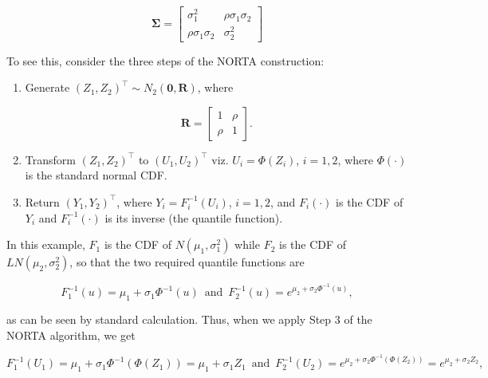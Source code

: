 \documentclass[
]{jss}
\begin{document}
\begin{equation}
\label{eq:kram2}
\boldsymbol \Sigma = 
\begin{bmatrix}
\sigma_1^2 & \rho \sigma_1\sigma_2\\
\rho \sigma_1\sigma_2 & \sigma_2^2
\end{bmatrix}
\end{equation}

To see this, consider the three steps of the NORTA construction:

\begin{enumerate}

\item Generate $(Z_1, Z_2)^\top \sim N_2(\boldsymbol 0, \boldsymbol R)$, where 

\begin{equation}
\label{eq:kram3}
\boldsymbol R = 
\left[
\begin{array}{cc}
1 & \rho \\
\rho & 1
\end{array}
\right].
\end{equation}


\item Transform $(Z_1, Z_2)^\top$ to $(U_1, U_2)^\top$ viz. $U_i =\Phi(Z_i)$,  $i=1,2$, where $\Phi(\cdot)$ is the standard normal CDF. 

\item Return $(Y_1, Y_2)^\top$, where $Y_i=F_i^{-1}(U_i)$, $i=1,2$, and $F_i(\cdot)$ is the CDF of $Y_i$ and $F_i^{-1}(\cdot)$ is its inverse (the quantile function). 

\end{enumerate}

In this example, \(F_1\) is the CDF of \(N(\mu_1, \sigma_1^2)\) while
\(F_2\) is the CDF of \(LN(\mu_2, \sigma_2^2)\), so that the two
required quantile functions are

\begin{equation}
\label{eq:kram4}
F_1^{-1}(u) = \mu_1+\sigma_1 \Phi^{-1}(u)\,\,\, \mbox{and} \,\,\, F_2^{-1}(u) = e^{\mu_2+\sigma_2 \Phi^{-1}(u)}, 
\end{equation}

as can be seen by standard calculation. Thus, when we apply Step 3 of
the NORTA algorithm, we get

\begin{equation}
\label{eq:kram5}
F_1^{-1}(U_1) = \mu_1+\sigma_1 \Phi^{-1}(\Phi(Z_1)) =  \mu_1+\sigma_1 Z_1 \,\,\, \mbox{and} \,\,\, F_2^{-1}(U_2) = e^{\mu_2+\sigma_2 \Phi^{-1}(\Phi(Z_2))} = e^{\mu_2+\sigma_2 Z_2}, 
\end{equation}
\end{document}

